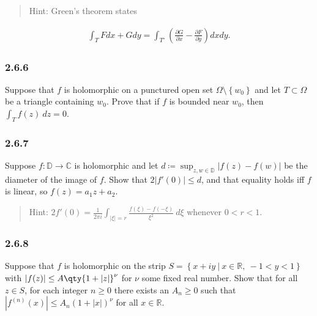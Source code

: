\begin{quote}
Hint: Green's theorem states
\end{quote}

\begin{align*}
\int_{T} F d x+G d y=\int_{T^\circ}\left(\frac{\partial G}{\partial x}-\frac{\partial F}{\partial y}\right) d x d y
.\end{align*}

\hypertarget{section-35}{%
\subsubsection{2.6.6}\label{section-35}}

Suppose that \(f\) is holomorphic on a punctured open set
\(\Omega\setminus\left\{{w_0}\right\}\) and let \(T\subset \Omega\) be a
triangle containing \(w_0\). Prove that if \(f\) is bounded near
\(w_0\), then \(\int_T f(z) ~dz = 0\).

\hypertarget{section-36}{%
\subsubsection{2.6.7}\label{section-36}}

Suppose \(f: {\mathbb{D}}\to {\mathbb{C}}\) is holomorphic and let
\(d \coloneqq\sup_{z, w\in {\mathbb{D}}}{\left\lvert {f(z) - f(w)} \right\rvert}\)
be the diameter of the image of \(f\). Show that
\(2 {\left\lvert {f'(0)} \right\rvert} \leq d\), and that equality holds
iff \(f\) is linear, so \(f(z) = a_1 z + a_2\).

\begin{quote}
Hint:
\(2f'(0) = \frac{1}{2\pi i} \int_{{\left\lvert {\xi } \right\rvert}= r} \frac{ f(\xi) - f(-\xi) }{\xi^2} ~d\xi\)
whenever \(0<r<1\).
\end{quote}

\hypertarget{section-37}{%
\subsubsection{2.6.8}\label{section-37}}

Suppose that \(f\) is holomorphic on the strip
\(S = \left\{{x+iy {~\mathrel{\Big|}~}x\in {\mathbb{R}},~ -1<y<1}\right\}\)
with
\({\left\lvert {f(z)} \right\rvert} \leq A \qty{1 + {\left\lvert {z} \right\rvert}}^\nu\)
for \(\nu\) some fixed real number. Show that for all \(z\in S\), for
each integer \(n\geq 0\) there exists an \(A_n \geq 0\) such that
\({\left\lvert {f^{(n)}(x)} \right\rvert} \leq A_n (1 + {\left\lvert {x} \right\rvert})^\nu\)
for all \(x\in {\mathbb{R}}\).

